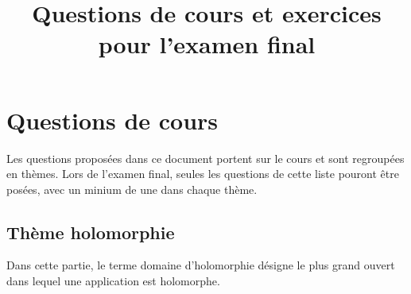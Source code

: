 \documentclass[a4paper, 12pt]{amsart}
\title{Questions de cours et exercices pour l'examen final}
\begin{document}
\maketitle
\section{Questions de cours}
Les questions proposées dans ce document portent sur le cours et sont regroupées en thèmes. Lors de l'examen final, seules les questions de cette liste pouront être
posées, avec un minium de une dans chaque thème.
\subsection{Thème holomorphie}
Dans cette partie, le terme domaine d'holomorphie désigne le plus grand ouvert
dans lequel une application est holomorphe.
\end{document}
